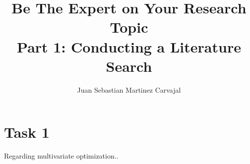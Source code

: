 \documentclass{journal}
\title{\textbf{Be The Expert on Your Research Topic}\\Part 1: Conducting a Literature Search}
\author{Juan Sebastian Martinez Carvajal}
\date{}
\begin{document}
\maketitle
\hrulefill

\section{Task 1}
Regarding multivariate optimization..
\end{document}
